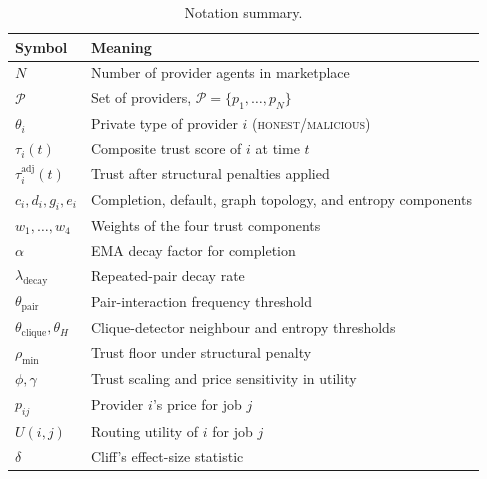 \documentclass[sigconf,nonacm,10pt]{acmart}
\begin{document}
\begin{table}[!t]
  \centering
  \caption{Notation summary.}
  \label{tab:notation}
  \footnotesize
  \setlength{\tabcolsep}{4pt}
  \begin{tabularx}{\columnwidth}{lX}
    \toprule
    Symbol & Meaning \\
    \midrule
    $N$               & Number of provider agents in marketplace \\
    $\mathcal{P}$     & Set of providers,
                        $\mathcal{P} = \{p_1, \ldots, p_N\}$ \\
    $\theta_i$        & Private type of provider $i$
                        (\textsc{honest}/\textsc{malicious}) \\
    $\tau_i(t)$       & Composite trust score of $i$ at time $t$ \\
    $\tau_i^{\text{adj}}(t)$
                      & Trust after structural penalties applied \\
    $c_i, d_i, g_i, e_i$
                      & Completion, default, graph topology, and
                        entropy components \\
    $w_1,\ldots,w_4$  & Weights of the four trust components \\
    $\alpha$          & EMA decay factor for completion \\
    $\lambda_{\text{decay}}$
                      & Repeated-pair decay rate \\
    $\theta_{\text{pair}}$
                      & Pair-interaction frequency threshold \\
    $\theta_{\text{clique}}, \theta_H$
                      & Clique-detector neighbour and entropy
                        thresholds \\
    $\rho_{\min}$     & Trust floor under structural penalty \\
    $\phi, \gamma$    & Trust scaling and price sensitivity in
                        utility \\
    $p_{ij}$          & Provider $i$'s price for job $j$ \\
    $U(i,j)$          & Routing utility of $i$ for job $j$ \\
    $\delta$          & Cliff's effect-size statistic \\
    \bottomrule
  \end{tabularx}
\end{table}
\end{document}
